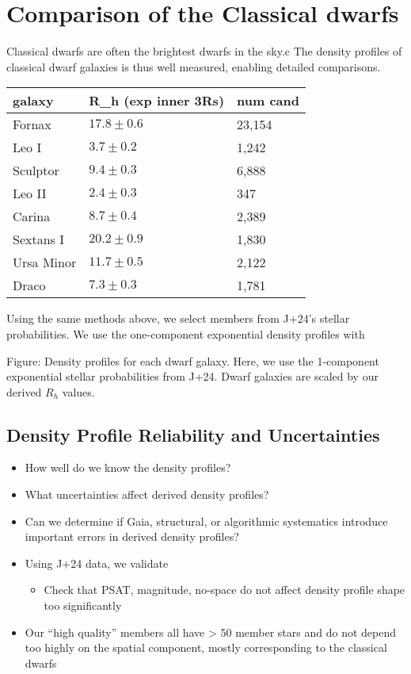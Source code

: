 \section{Comparison of the Classical
dwarfs}\label{comparison-of-the-classical-dwarfs}

Classical dwarfs are often the brightest dwarfs in the sky.c The density
profiles of classical dwarf galaxies is thus well measured, enabling
detailed comparisons.

\begin{table*}[t]
\centering
\begin{tabular}{lll}
\toprule
galaxy & R\_h (exp inner 3Rs) & num cand\\
\midrule
Fornax & $17.8\pm0.6$ & 23,154\\
Leo I & $3.7\pm0.2$ & 1,242\\
Sculptor & $9.4\pm0.3$ & 6,888\\
Leo II & $2.4\pm0.3$ & 347\\
Carina & $8.7\pm0.4$ & 2,389\\
Sextans I & $20.2 \pm0.9$ & 1,830\\
Ursa Minor & $11.7 \pm 0.5$ & 2,122\\
Draco & $7.3\pm0.3$ & 1,781\\
\bottomrule
\end{tabular}
\end{table*}

Using the same methods above, we select members from J+24's stellar
probabilities. We use the one-component exponential density profiles
with

Figure: Density profiles for each dwarf galaxy. Here, we use the
1-component exponential stellar probabilities from J+24. Dwarf galaxies
are scaled by our derived \(R_h\) values.

\subsection{Density Profile Reliability and
Uncertainties}\label{density-profile-reliability-and-uncertainties}

\begin{itemize}
\tightlist
\item
  How well do we know the density profiles?
\item
  What uncertainties affect derived density profiles?
\item
  Can we determine if Gaia, structural, or algorithmic systematics
  introduce important errors in derived density profiles?
\item
  Using J+24 data, we validate

  \begin{itemize}
  \tightlist
  \item
    Check that PSAT, magnitude, no-space do not affect density profile
    shape too significantly
  \end{itemize}
\item
  Our ``high quality'' members all have \textgreater{} 50 member stars
  and do not depend too highly on the spatial component, mostly
  corresponding to the classical dwarfs
\end{itemize}

